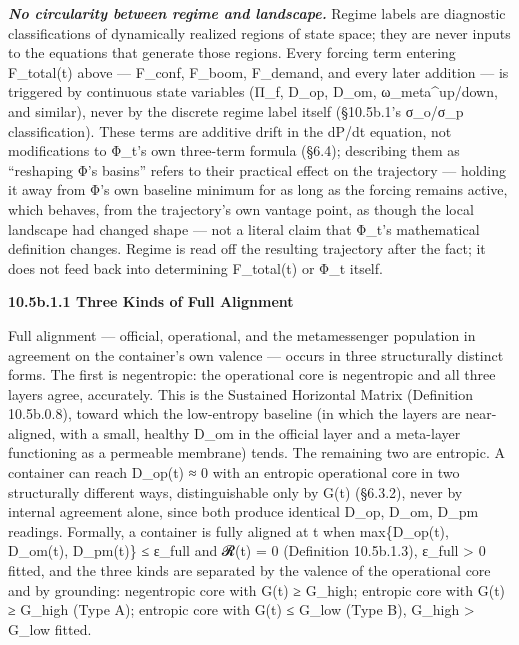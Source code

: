\documentclass[
]{article}
\begin{document}
\emph{\textbf{No circularity between regime and landscape.}} Regime
labels are diagnostic classifications of dynamically realized regions of
state space; they are never inputs to the equations that generate those
regions. Every forcing term entering F\_total(t) above --- F\_conf,
F\_boom, F\_demand, and every later addition --- is triggered by
continuous state variables (Π\_f, D\_op, D\_om, ω\_meta\^{}up/down, and
similar), never by the discrete regime label itself (§10.5b.1's
σ\_o/σ\_p classification). These terms are additive drift in the dP/dt
equation, not modifications to Φ\_t's own three-term formula (§6.4);
describing them as ``reshaping Φ's basins'' refers to their practical
effect on the trajectory --- holding it away from Φ's own baseline
minimum for as long as the forcing remains active, which behaves, from
the trajectory's own vantage point, as though the local landscape had
changed shape --- not a literal claim that Φ\_t's mathematical
definition changes. Regime is read off the resulting trajectory after
the fact; it does not feed back into determining F\_total(t) or Φ\_t
itself.

\textbf{10.5b.1.1 Three Kinds of Full Alignment}

Full alignment --- official, operational, and the metamessenger
population in agreement on the container's own valence --- occurs in
three structurally distinct forms. The first is negentropic: the
operational core is negentropic and all three layers agree, accurately.
This is the Sustained Horizontal Matrix (Definition 10.5b.0.8), toward
which the low-entropy baseline (in which the layers are near-aligned,
with a small, healthy D\_om in the official layer and a meta-layer
functioning as a permeable membrane) tends. The remaining two are
entropic. A container can reach D\_op(t) ≈ 0 with an entropic
operational core in two structurally different ways, distinguishable
only by G(t) (§6.3.2), never by internal agreement alone, since both
produce identical D\_op, D\_om, D\_pm readings. Formally, a container is
fully aligned at t when max\{D\_op(t), D\_om(t), D\_pm(t)\} ≤ ε\_full
and 𝓡(t) = 0 (Definition 10.5b.1.3), ε\_full \textgreater{} 0 fitted,
and the three kinds are separated by the valence of the operational core
and by grounding: negentropic core with G(t) ≥ G\_high; entropic core
with G(t) ≥ G\_high (Type A); entropic core with G(t) ≤ G\_low (Type B),
G\_high \textgreater{} G\_low fitted.
\end{document}
